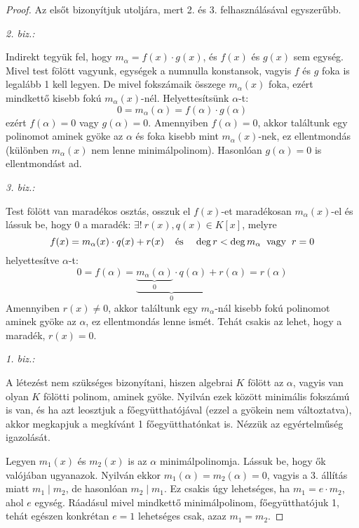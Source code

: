 \documentclass[12pt]{book}
\theoremstyle{plain} %
\theoremstyle{definition} %
\theoremstyle{remark}
\numberwithin{equation}{section}  %
\begin{document}
	\begin{proof}
		Az elsőt bizonyítjuk utoljára, mert 2. és 3. felhasználásával egyszerűbb.
		
		\textit{2. biz.:}
		
		Indirekt tegyük fel, hogy $m_\alpha = f(x)\cdot g(x)$, és $f(x)$ és $g(x)$ sem egység. Mivel test fölött vagyunk, egységek a numnulla konstansok, vagyis $f$ és $g$ foka is legalább 1 kell legyen. De mivel fokszámaik összege $m_\alpha(x)$ foka, ezért mindkettő kisebb fokú $m_\alpha(x)$-nél. Helyettesítsünk $\alpha$-t:
		\[ 0 = m_\alpha(\alpha) = f(\alpha) \cdot g(\alpha)  \]
		ezért $f(\alpha)=0$ vagy $g(\alpha)=0$. Amennyiben $f(\alpha)=0$, akkor találtunk egy polinomot aminek gyöke az $\alpha$ és foka kisebb mint $m_\alpha(x)$-nek, ez ellentmondás (különben $m_\alpha(x)$ nem lenne minimálpolinom). Hasonlóan $g(\alpha)=0$ is ellentmondást ad.
		
		\textit{3. biz.:}
		
		Test fölött van maradékos osztás, osszuk el $f(x)$-et maradékosan $m_\alpha(x)$-el és lássuk be, hogy $0$ a maradék: $\exists!\ r(x),q(x)\in K[x]$, melyre
		\[ f(x) = m_\alpha(x) \cdot q(x) + r(x) \hspace{4mm} \text{és} \hspace{4mm} \deg r < \deg m_\alpha \hspace{2mm} \text{vagy} \hspace{2mm} r=0  \]
		helyettesítve $\alpha$-t:
		\[ 0 = f(\alpha) = \underbrace{\underbrace{m_\alpha(\alpha)}_{0}\cdot q(\alpha)}_{0} + r(\alpha) = r(\alpha) \]
		Amennyiben $r(x)\neq 0$, akkor találtunk egy $m_\alpha$-nál kisebb fokú polinomot aminek gyöke az $\alpha$, ez ellentmondás lenne ismét. Tehát csakis az lehet, hogy a maradék, $r(x)=0$.
		
		\textit{1. biz.:}
		
		A létezést nem szükséges bizonyítani, hiszen algebrai $K$ fölött az $\alpha$, vagyis van olyan $K$ fölötti polinom, aminek gyöke. Nyilván ezek között minimális fokszámú is van, és ha azt leosztjuk a főegyütthatójával (ezzel a gyökein nem változtatva), akkor megkapjuk a megkívánt 1 főegyütthatónkat is. Nézzük az egyértelműség igazolását.
		
		Legyen $m_1(x)$ és $m_2(x)$	is az $\alpha$ minimálpolinomja. Lássuk be, hogy ők valójában ugyanazok. Nyilván ekkor $m_1(\alpha)=m_2(\alpha)=0$, vagyis a 3. állítás miatt $m_1 \mid m_2$, de hasonlóan $m_2\mid m_1$. Ez csakis úgy lehetséges, ha $m_1 = e\cdot m_2$, ahol $e$ egység. Ráadásul mivel mindkettő minimálpolinom, főegyütthatójuk 1, tehát egészen konkrétan $e=1$ lehetséges csak, azaz $m_1 = m_2$.	
	\end{proof}
	
\end{document}

